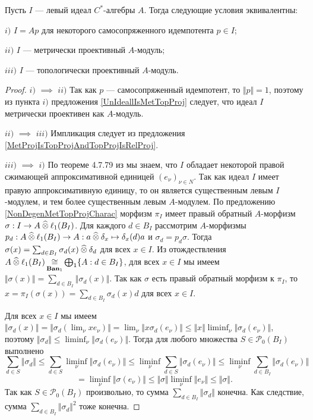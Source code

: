 \begin{theorem}\label{LeftIdealOfCStarAlgMetTopProjCharac} Пусть $I$ --- левый идеал $C^*$-алгебры $A$. Тогда следующие условия эквивалентны:

$i)$ $I=Ap$ для некоторого самосопряженного идемпотента $p\in I$;

$ii)$ $I$ --- метрически проективный $A$-модуль;

$iii)$ $I$ --- топологически проективный $A$-модуль.
\end{theorem}
\begin{proof} $i)$ $\implies$ $ii)$ Так как $p$ --- самосопряженный идемпотент, то $\Vert p\Vert=1$, поэтому из пункта $i)$ предложения \ref{UnIdeallIsMetTopProj} следует, что идеал $I$ метрически проективен как $A$-модуль.

$ii)$ $\implies$ $iii)$ Импликация следует из предложения \ref{MetProjIsTopProjAndTopProjIsRelProj}.

$iii)$ $\implies$ $i)$ По теореме 4.7.79 из \cite{HelBanLocConvAlg} мы знаем, что $I$ обладает некоторой правой сжимающей аппроксимативной единицей $(e_\nu)_{\nu\in N}$. Так как идеал $I$ имеет правую аппроксимативную единицу, то он является существенным левым $I$-модулем, и тем более существенным левым $A$-модулем. По предложению \ref{NonDegenMetTopProjCharac} морфизм $\pi_I$ имеет правый обратный $A$-морфизм $\sigma:I\to A\mathbin{\widehat{\otimes}} \ell_1(B_I)$. Для каждого $d\in B_I$ рассмотрим $A$-морфизмы $p_d:A\mathbin{\widehat{\otimes}} \ell_1(B_I)\to A:a\mathbin{\widehat{\otimes}} \delta_x\mapsto \delta_x(d)a$ и $\sigma_d=p_d\sigma$. Тогда $\sigma(x)=\sum_{d\in B_I}\sigma_d(x)\mathbin{\widehat{\otimes}} \delta_d$ для всех $x\in I$. Из отождествления $A\mathbin{\widehat{\otimes}}\ell_1(B_I)\mathop{\mathbin{\cong}}\limits_{\mathbf{Ban}_1}\bigoplus_1\{ A:d\in B_I\}$, для всех $x\in I$ мы имеем $\Vert\sigma(x)\Vert=\sum_{d\in B_I} \Vert\sigma_d(x)\Vert$. Так как $\sigma$ есть правый обратный морфизм к $\pi_I$, то $x=\pi_I(\sigma(x))=\sum_{d\in B_I}\sigma_d(x)d$ для всех $x\in I$. 

Для всех $x\in I$ мы имеем
$\Vert\sigma_d(x)\Vert=\Vert\sigma_d(\lim_\nu xe_\nu)\Vert=\lim_\nu\Vert x\sigma_d(e_\nu)\Vert \leq\Vert x\Vert\liminf_\nu\Vert\sigma_d(e_\nu)\Vert$, поэтому $\Vert\sigma_d\Vert\leq \liminf_\nu\Vert\sigma_d(e_\nu)\Vert$. Тогда для любого множества $S\in\mathcal{P}_0(B_I)$ выполнено
$$
\sum_{d\in S}\Vert \sigma_d\Vert
\leq \sum_{d\in S}\liminf_\nu\Vert \sigma_d(e_\nu)\Vert
\leq \liminf_\nu\sum_{d\in S}\Vert \sigma_d(e_\nu)\Vert
\leq \liminf_\nu\sum_{d\in B_I}\Vert \sigma_d(e_\nu) \Vert
$$
$$
=\liminf_{\nu}\Vert\sigma(e_\nu)\Vert
\leq \Vert\sigma\Vert\liminf_{\nu}\Vert e_\nu\Vert
\leq \Vert\sigma\Vert.
$$
Так как $S\in \mathcal{P}_0(B_I)$ произвольно, то сумма $\sum_{d\in B_I}\Vert\sigma_d\Vert$ конечна. Как следствие, сумма $\sum_{d\in B_I}\Vert\sigma_d\Vert^2$ тоже конечна. 


\end{proof}
